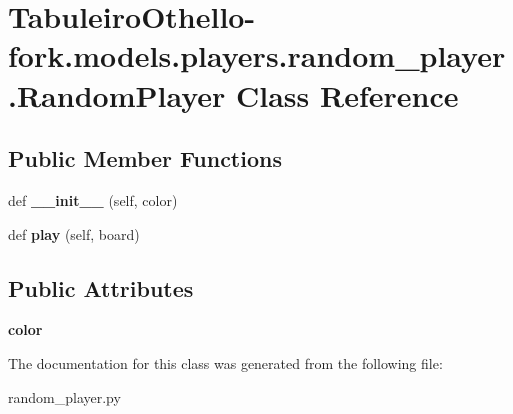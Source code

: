 \hypertarget{class_tabuleiro_othello-fork_1_1models_1_1players_1_1random__player_1_1_random_player}{}\section{Tabuleiro\+Othello-\/fork.models.\+players.\+random\+\_\+player.\+Random\+Player Class Reference}
\label{class_tabuleiro_othello-fork_1_1models_1_1players_1_1random__player_1_1_random_player}
\subsection*{Public Member Functions}
\begin{DoxyCompactItemize}
\item 
\hypertarget{class_tabuleiro_othello-fork_1_1models_1_1players_1_1random__player_1_1_random_player_a459d3baff18a9f4ff4a3d9b7111d9739}{}def {\bfseries \+\_\+\+\_\+init\+\_\+\+\_\+} (self, color)\label{class_tabuleiro_othello-fork_1_1models_1_1players_1_1random__player_1_1_random_player_a459d3baff18a9f4ff4a3d9b7111d9739}

\item 
\hypertarget{class_tabuleiro_othello-fork_1_1models_1_1players_1_1random__player_1_1_random_player_ac87e91e898d8c4d565ddd633b54da1f3}{}def {\bfseries play} (self, board)\label{class_tabuleiro_othello-fork_1_1models_1_1players_1_1random__player_1_1_random_player_ac87e91e898d8c4d565ddd633b54da1f3}

\end{DoxyCompactItemize}
\subsection*{Public Attributes}
\begin{DoxyCompactItemize}
\item 
\hypertarget{class_tabuleiro_othello-fork_1_1models_1_1players_1_1random__player_1_1_random_player_a838e982efda41b04885e21f726f51e89}{}{\bfseries color}\label{class_tabuleiro_othello-fork_1_1models_1_1players_1_1random__player_1_1_random_player_a838e982efda41b04885e21f726f51e89}

\end{DoxyCompactItemize}


The documentation for this class was generated from the following file\+:\begin{DoxyCompactItemize}
\item 
random\+\_\+player.\+py\end{DoxyCompactItemize}

